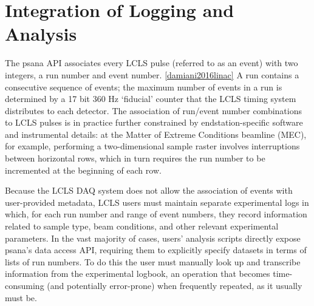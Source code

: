 \section{Integration of Logging and Analysis}
The psana API associates every LCLS pulse (referred to as an event) with two integers, a run number and event number. \ref{damiani2016linac} A run contains a consecutive sequence of events; the maximum number of events in a run is determined by a 17 bit 360 Hz `fiducial' counter that the LCLS timing system distributes to each detector. The association of run/event number combinations to LCLS pulses is in practice further constrained by endstation-specific software and instrumental details: at the Matter of Extreme Conditions beamline (MEC), for example, performing a two-dimensional sample raster involves interruptions between horizontal rows, which in turn requires the run number to be incremented at the beginning of each row. 

Because the LCLS DAQ system does not allow the association of events with user-provided metadata, LCLS users must maintain separate experimental logs in which, for each run number and range of event numbers, they record information related to sample type, beam conditions, and other relevant experimental parameters.  In the vast majority of cases, users' analysis scripts directly expose psana's data access API, requiring them to explicitly specify datasets in terms of lists of run numbers. To do this the user must manually look up and transcribe information from the experimental logbook, an operation that becomes time-consuming (and potentially error-prone) when frequently repeated, as it usually must be.

